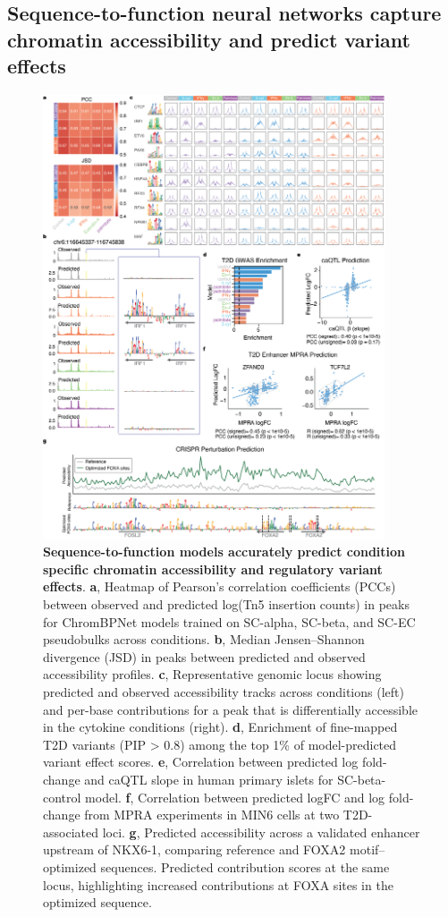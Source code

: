 \subsection{Sequence-to-function neural networks capture chromatin accessibility and predict variant effects}

\begin{figure}[p]
    \centering
    \includegraphics[width=0.9\textwidth, height=0.745\textheight]{3_figures-and-files/Fig4.png}
    \caption[Prediction of chromatin accessibility and variant effects]{\textbf{Sequence-to-function models accurately predict condition specific chromatin accessibility and regulatory variant effects}. \textbf{a}, Heatmap of Pearson’s correlation coefficients (PCCs) between observed and predicted log(Tn5 insertion counts) in peaks for ChromBPNet models trained on SC-alpha, SC-beta, and SC-EC pseudobulks across conditions. \textbf{b}, Median Jensen–Shannon divergence (JSD) in peaks between predicted and observed accessibility profiles. \textbf{c}, Representative genomic locus showing predicted and observed accessibility tracks across conditions (left) and per-base contributions for a peak that is differentially accessible in the cytokine conditions (right). \textbf{d}, Enrichment of fine-mapped T2D variants (PIP > 0.8) among the top 1\% of model-predicted variant effect scores. \textbf{e}, Correlation between predicted log fold-change and caQTL slope in human primary islets for SC-beta-control model. \textbf{f}, Correlation between predicted logFC and log fold-change from MPRA experiments in MIN6 cells at two T2D-associated loci. \textbf{g}, Predicted accessibility across a validated enhancer upstream of NKX6-1, comparing reference and FOXA2 motif–optimized sequences. Predicted contribution scores at the same locus, highlighting increased contributions at FOXA sites in the optimized sequence.}

\end{figure}
